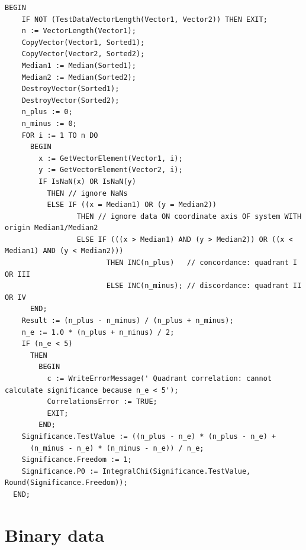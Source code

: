 \begin{refsection}
\begin{lstlisting}[caption=Quadrant correlation and its significance]
  BEGIN
    IF NOT (TestDataVectorLength(Vector1, Vector2)) THEN EXIT;
    n := VectorLength(Vector1);
    CopyVector(Vector1, Sorted1);
    CopyVector(Vector2, Sorted2);
    Median1 := Median(Sorted1);
    Median2 := Median(Sorted2);
    DestroyVector(Sorted1);
    DestroyVector(Sorted2);
    n_plus := 0;
    n_minus := 0;
    FOR i := 1 TO n DO
      BEGIN
        x := GetVectorElement(Vector1, i);
        y := GetVectorElement(Vector2, i);
        IF IsNaN(x) OR IsNaN(y)
          THEN // ignore NaNs
          ELSE IF ((x = Median1) OR (y = Median2))
                 THEN // ignore data ON coordinate axis OF system WITH origin Median1/Median2
                 ELSE IF (((x > Median1) AND (y > Median2)) OR ((x < Median1) AND (y < Median2)))
                        THEN INC(n_plus)   // concordance: quadrant I OR III
                        ELSE INC(n_minus); // discordance: quadrant II OR IV
      END;
    Result := (n_plus - n_minus) / (n_plus + n_minus);
    n_e := 1.0 * (n_plus + n_minus) / 2;
    IF (n_e < 5)
      THEN
        BEGIN
          c := WriteErrorMessage(' Quadrant correlation: cannot calculate significance because n_e < 5');
          CorrelationsError := TRUE;
          EXIT;
        END;
    Significance.TestValue := ((n_plus - n_e) * (n_plus - n_e) +
      (n_minus - n_e) * (n_minus - n_e)) / n_e;
    Significance.Freedom := 1;
    Significance.P0 := IntegralChi(Significance.TestValue, Round(Significance.Freedom));
  END;
\end{lstlisting}

\section{Binary data}


\end{refsection}
